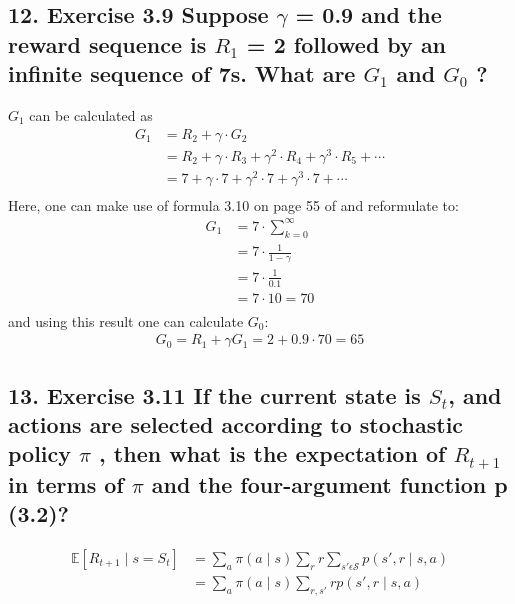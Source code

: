 \subsection*{12. Exercise 3.9 Suppose $\gamma$ = 0.9 and the reward sequence is $R_1$ = 2 followed by an infinite sequence of 7s. What are $G_1$ and $G_0$ ?}
$G_1$ can be calculated as
\begin{align*}
G_1 &= R_2 + \gamma \cdot G_2 \\&= R_2 + \gamma \cdot R_3 + \gamma^2 \cdot R_4 + \gamma^3 \cdot R_5 + \cdots \\
 	&= 7 + \gamma \cdot 7 + \gamma^2 \cdot 7 + \gamma^3 \cdot 7 + \cdots \\
\end{align*}
Here, one can make use of formula 3.10 on page 55 of \cite{Sutton1998} and reformulate to:
\begin{align*}
G_1 &= 7 \cdot \sum_{k=0}^\infty \\&= 7 \cdot \frac{1}{1 - \gamma} \\&= 7 \cdot \frac{1}{0.1} \\&= 7 \cdot 10 = 70 \\
\end{align*}
and using this result one can calculate $G_0$:
\begin{align*}
G_0 = R_1 + \gamma G_1 = 2 + 0.9 \cdot 70 = 65
\end{align*}

\subsection*{13. Exercise 3.11 If the current state is $S_t$, and actions are selected according to stochastic policy $\pi$ , then what is the expectation of $R_{t+1}$ in terms of $\pi$ and the four-argument function p (3.2)?}
\begin{align*}
\mathbb{E}[R_{t+1} \mid s=S_t] &= \sum_a \pi(a \mid s) \sum_r r \sum_{s' \epsilon \mathcal{S}} p(s', r \mid s, a) \\
&= \sum_a \pi(a \mid s) \sum_{r, s'} r p(s', r \mid s, a)
\end{align*}

